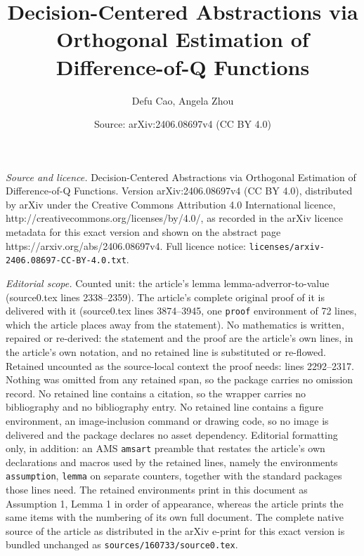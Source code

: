 \documentclass[10pt,a4paper]{amsart}
\title{Decision-Centered Abstractions via Orthogonal Estimation of Difference-of-Q Functions}
\author{Defu Cao, Angela Zhou}
\date{Source: arXiv:2406.08697v4 (CC BY 4.0)}
\begin{document}
\maketitle

\noindent\emph{Source and licence.} Decision-Centered Abstractions via Orthogonal Estimation of Difference-of-Q Functions. Version arXiv:2406.08697v4 (CC BY 4.0), distributed by arXiv under the Creative Commons Attribution 4.0 International licence, http://creativecommons.org/licenses/by/4.0/, as recorded in the arXiv licence metadata for this exact version and shown on the abstract page https://arxiv.org/abs/2406.08697v4. Full licence notice: \texttt{licenses/arxiv-2406.08697-CC-BY-4.0.txt}.\par\smallskip

\noindent\textit{Editorial scope.} Counted unit: the article's lemma lemma-adverror-to-value (source0.tex lines 2338--2359). The article's complete original proof of it is delivered with it (source0.tex lines 3874--3945, one \texttt{proof} environment of 72 lines, which the article places away from the statement). No mathematics is written, repaired or re-derived: the statement and the proof are the article's own lines, in the article's own notation, and no retained line is substituted or re-flowed.  Retained uncounted as the source-local context the proof needs: lines 2292--2317.  Nothing was omitted from any retained span, so the package carries no omission record.  No retained line contains a citation, so the wrapper carries no bibliography and no bibliography entry.  No retained line contains a figure environment, an image-inclusion command or drawing code, so no image is delivered and the package declares no asset dependency.  Editorial formatting only, in addition: an AMS \texttt{amsart} preamble that restates the article's own declarations and macros used by the retained lines, namely the environments \texttt{assumption}, \texttt{lemma} on separate counters, together with the standard packages those lines need.  The retained environments print in this document as Assumption 1, Lemma 1 in order of appearance, whereas the article prints the same items with the numbering of its own full document.  The complete native source of the article as distributed in the arXiv e-print for this exact version is bundled unchanged as \texttt{sources/160733/source0.tex}.
\end{document}
